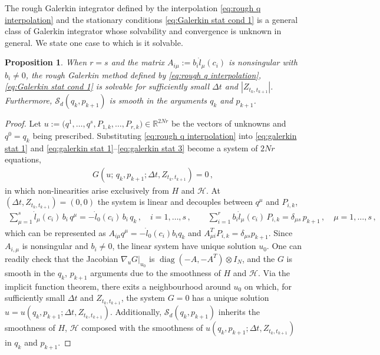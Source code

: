 \documentclass[11pt, oneside]{article}
\numberwithin{equation}{section}
\newtheorem{proposition}[lemma]{Proposition}
\theoremstyle{definition}
\newcommand{\mc}[1]{\mathcal{#1}}
\newcommand{\mcal}[1]{\mc{#1}}
\begin{document}
The rough Galerkin integrator defined by the interpolation \eqref{eq:rough q interpolation} and the stationary conditions \eqref{eq:Galerkin stat cond 1} is a general class of Galerkin integrator whose solvability and convergence is unknown in general. We state one case to which is it solvable.
\begin{proposition}\label{prop: solvability Galerkin}
    When $r=s$ and the matrix $A_{i\mu}:=b_i\dot{l}_\mu(c_i)$ is nonsingular with $b_i \neq 0$, the rough Galerkin method defined by \eqref{eq:rough q interpolation}, \eqref{eq:Galerkin stat cond 1} is solvable for sufficiently small $\Delta t$ and $|Z_{t_k, t_{k+1}}|$. Furthermore, $\mcal{S}_d(q_k, p_{k+1})$ is smooth in the arguments $q_k$ and $p_{k+1}$.
\end{proposition}
\begin{proof}
Let $u := \bigl(q^1,\ldots,q^s, P_{1,k},\ldots,P_{r,k}\bigr) \in \mathbb{R}^{2Nr}$ be the vectors of unknowns and $q^0 = q_k$ being prescribed. Substituting \eqref{eq:rough q interpolation} into \eqref{eq:galerkin stat 1} and \eqref{eq:galerkin stat 1}--\eqref{eq:galerkin stat 3} become a system of $2Nr$ equations,
\begin{align*}
    G\left(u;\, q_k, p_{k+1}; \Delta t, Z_{t_k, t_{k+1}}\right) = 0\,,
\end{align*}
in which non-linearities arise exclusively from $H$ and $\mcal{H}$. At $(\Delta t, Z_{t_k, t_{k+1}}) = (0,0)$ the system is linear and decouples between $q^\mu$ and $P_{i,k}$,
\begin{align*}
    \sum_{\mu=1}^s \dot{l}_\mu(c_i)\, b_i\, q^\mu = -\dot{l}_0(c_i)\,b_i\,q_k\,,\quad i = 1,\ldots,s\,,
    \qquad
    \sum_{i=1}^r b_i \dot{l}_\mu(c_i)\, P_{i,k} = \delta_{\mu s}\, p_{k+1}\,,\quad \mu = 1,\ldots,s\,,
\end{align*}
which can be represented as $A_{i\mu}q^\mu = -\dot{l}_0(c_i)b_i q_k$ and $A^T_{\mu i}P_{i,k} = \delta_{\mu s}p_{k+1}$. Since $A_{i, \mu}$ is nonsingular and $b_i \neq 0$, the linear system have unique solution $u_0$. One can readily check that the Jacobian $\nabla_uG|_{u_0}$ is $\operatorname{diag}(-A, -A^T)\otimes I_N$, and the $G$ is smooth in the $q_k$, $p_{k+1}$ arguments due to the  smoothness of $H$ and $\mcal{H}$. Via the implicit function theorem, there exits a neighbourhood around $u_0$ on which, for sufficiently small $\Delta t$ and $Z_{t_k, t_{k+1}}$, the system $G = 0$ has a unique solution $u = u(q_k, p_{k+1}; \Delta t, Z_{t_k, t_{k+1}})$. Additionally, $\mcal{S}_d(q_k, p_{k+1})$ inherits the smoothness of $H$, $\mcal{H}$ composed with the smoothness of $u(q_k, p_{k+1}; \Delta t, Z_{t_k, t_{k+1}})$ in $q_k$ and $p_{k+1}$.
\end{proof}
\end{document}
